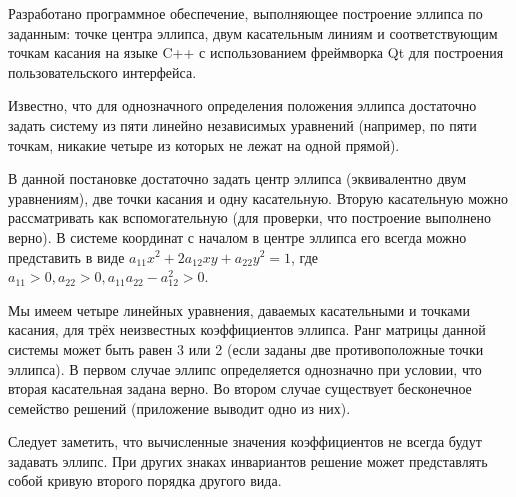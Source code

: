 \documentclass[oneside,final,14pt]{extarticle}
\begin{document}
\thispagestyle{empty}
Разработано программное обеспечение, выполняющее построение эллипса по заданным: точке центра эллипса, двум касательным линиям и соответствующим точкам касания на языке C++ с использованием фреймворка Qt для построения пользовательского интерфейса.

Известно, что для однозначного определения положения эллипса достаточно задать систему из пяти линейно независимых уравнений (например, по пяти точкам, никакие четыре из которых не лежат на одной прямой).

В данной постановке достаточно задать центр эллипса (эквивалентно двум уравнениям), две точки касания и одну касательную. Вторую касательную можно рассматривать как вспомогательную (для проверки, что построение выполнено верно). В системе координат с началом в центре эллипса его всегда можно представить в виде $a_{11}x^2+2a_{12}xy+a_{22}y^2=1$, где $a_{11}>0, a_{22}>0, a_{11}a_{22}-a_{12}^2>0$.

Мы имеем четыре линейных уравнения, даваемых касательными и точками касания, для трёх неизвестных коэффициентов эллипса. Ранг матрицы данной системы может быть равен 3 или 2 (если заданы две противоположные точки эллипса). В первом случае эллипс определяется однозначно при условии, что вторая касательная задана верно. Во втором случае существует бесконечное семейство решений (приложение выводит одно из них).

Следует заметить, что вычисленные значения коэффициентов не всегда будут задавать эллипс. При других знаках инвариантов решение может представлять собой кривую второго порядка другого вида.
\end{document}

